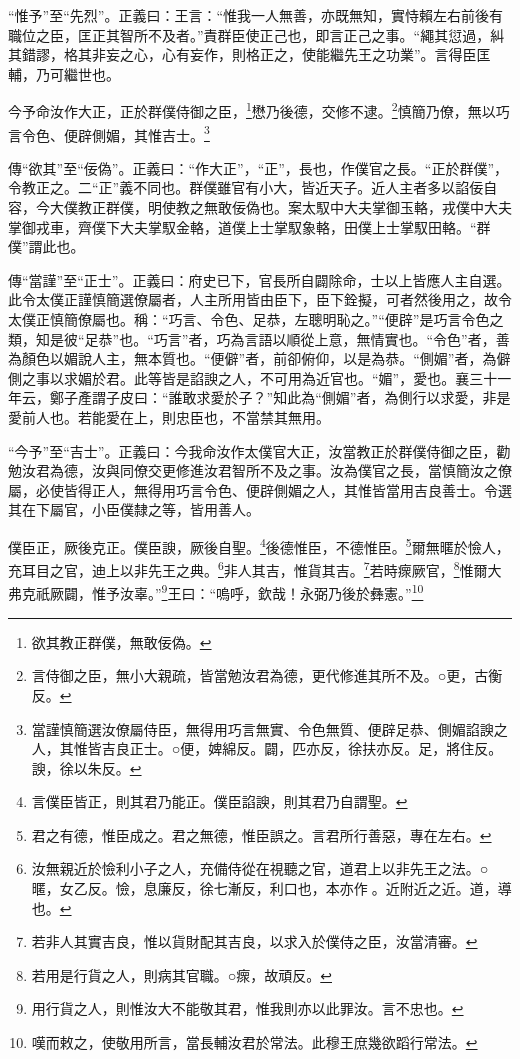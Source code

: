{\noindent\shu{}\fzkt “惟予”至“先烈”。正義曰：王言：“惟我一人無善，亦既無知，實恃賴左右前後有職位之臣，匡正其智所不及者。”責群臣使正己也，即言正己之事。“繩其愆過，糾其錯謬，格其非妄之心，心有妄作，則格正之，使能繼先王之功業”。言得臣匡輔，乃可繼世也。 \par}

今予命汝作大正，正於群僕侍御之臣，\footnote{欲其教正群僕，無敢佞偽。}懋乃後德，交修不逮。\footnote{言侍御之臣，無小大親疏，皆當勉汝君為德，更代修進其所不及。○更，古衡反。}慎簡乃僚，無以巧言令色、便辟側媚，其惟吉士。\footnote{當謹慎簡選汝僚屬侍臣，無得用巧言無實、令色無質、便辟足恭、側媚諂諛之人，其惟皆吉良正士。○便，婢綿反。闢，匹亦反，徐扶亦反。足，將住反。諛，徐以朱反。}


{\noindent\zhuan{}\fzbyks 傳“欲其”至“佞偽”。正義曰：“作大正”，“正”，長也，作僕官之長。“正於群僕”，令教正之。二“正”義不同也。群僕雖官有小大，皆近天子。近人主者多以諂佞自容，今大僕教正群僕，明使教之無敢佞偽也。案太馭中大夫掌御玉輅，戎僕中大夫掌御戎車，齊僕下大夫掌馭金輅，道僕上士掌馭象輅，田僕上士掌馭田輅。“群僕”謂此也。 \par}

{\noindent\zhuan{}\fzbyks 傳“當謹”至“正士”。正義曰：府史已下，官長所自闢除命，士以上皆應人主自選。此令太僕正謹慎簡選僚屬者，人主所用皆由臣下，臣下銓擬，可者然後用之，故令太僕正慎簡僚屬也。稱：“巧言、令色、足恭，左聰明恥之。”“便辟”是巧言令色之類，知是彼“足恭”也。“巧言”者，巧為言語以順從上意，無情實也。“令色”者，善為顏色以媚說人主，無本質也。“便僻”者，前卻俯仰，以是為恭。“側媚”者，為僻側之事以求媚於君。此等皆是諂諛之人，不可用為近官也。“媚”，愛也。襄三十一年云，鄭子產謂子皮曰：“誰敢求愛於子？”知此為“側媚”者，為側行以求愛，非是愛前人也。若能愛在上，則忠臣也，不當禁其無用。 \par}

{\noindent\shu{}\fzkt “今予”至“吉士”。正義曰：今我命汝作太僕官大正，汝當教正於群僕侍御之臣，勸勉汝君為德，汝與同僚交更修進汝君智所不及之事。汝為僕官之長，當慎簡汝之僚屬，必使皆得正人，無得用巧言令色、便辟側媚之人，其惟皆當用吉良善士。令選其在下屬官，小臣僕隸之等，皆用善人。 \par}

僕臣正，厥後克正。僕臣諛，厥後自聖。\footnote{言僕臣皆正，則其君乃能正。僕臣諂諛，則其君乃自謂聖。}後德惟臣，不德惟臣。\footnote{君之有德，惟臣成之。君之無德，惟臣誤之。言君所行善惡，專在左右。}爾無暱於憸人，充耳目之官，迪上以非先王之典。\footnote{汝無親近於憸利小子之人，充備侍從在視聽之官，道君上以非先王之法。○暱，女乙反。憸，息廉反，徐七漸反，利口也，本亦作𢘼。近附近之近。道，導也。}非人其吉，惟貨其吉。\footnote{若非人其實吉良，惟以貨財配其吉良，以求入於僕侍之臣，汝當清審。}若時瘝厥官，\footnote{若用是行貨之人，則病其官職。○瘝，故頑反。}惟爾大弗克祇厥闢，惟予汝辜。”\footnote{用行貨之人，則惟汝大不能敬其君，惟我則亦以此罪汝。言不忠也。}王曰：“嗚呼，欽哉！永弼乃後於彝憲。”\footnote{嘆而敕之，使敬用所言，當長輔汝君於常法。此穆王庶幾欲蹈行常法。}

